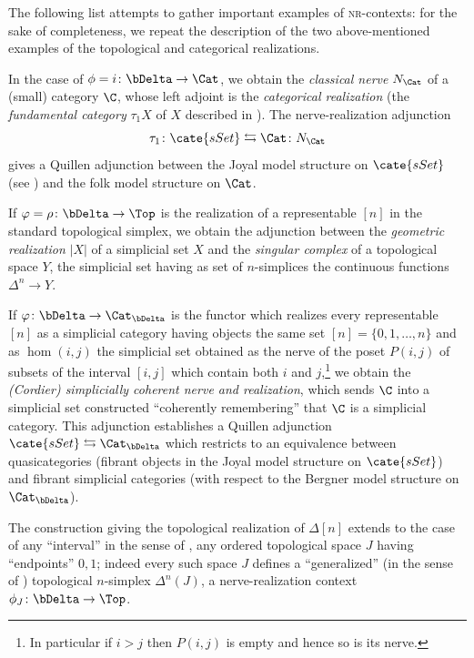 The following list attempts to gather important examples of \textsc{nr}-contexts: for the sake of completeness, we repeat the description of the two above-mentioned examples of the topological and categorical realizations.
\begin{example}\label{catnerve}
In the case of $\phi = i \colon \bDelta\to \Cat$, we obtain the \emph{classical nerve} $N_\Cat$ of a (small) category $\C$, whose left adjoint is the \emph{categorical realization} (the \emph{fundamental category} $\tau_1 X$ of $X$ described in \cite{joyal2002quasi}). The nerve\hyp{}realization adjunction
\[
\tau_1 \colon \cate{sSet}\leftrightarrows \Cat\colon N_{\Cat}
\]
gives a Quillen adjunction between the Joyal model structure on $\cate{sSet}$ (see \cite{joyal2002quasi}) and the folk model structure on $\Cat$.
\end{example}
\begin{example}\label{topnerve} 
If $\varphi = \rho \colon\bDelta\to \Top$ is the realization of a representable $[n]$ in the standard topological simplex, we obtain the adjunction between the \emph{geometric realization} $|X|$ of a simplicial set $X$ and the \emph{singular complex} of a topological space $Y$, \ie the simplicial set having as set of $n$-simplices the continuous functions $\Delta^n\to Y$.
\end{example}
\begin{example}
If $\varphi\colon \bDelta\to \Cat_{\bDelta}$ is the functor which realizes every representable $[n]$ as a simplicial category having objects the same set $[n]=\{0,1,\dots, n\}$ and as $\hom(i,j)$ 
the simplicial set obtained as the nerve of the poset $P(i,j)$ of subsets of the interval $[i,j]$ which contain both $i$ and $j$,\footnote{In particular if $i > j$ then $P(i,j)$ is empty and hence so is its nerve.} we obtain the \emph{(Cordier) simplicially coherent nerve and realization}, which sends $\C$ into a simplicial set constructed ``coherently remembering'' that $\C$ is a simplicial category. This adjunction establishes a Quillen adjunction $\cate{sSet}\leftrightarrows \Cat_{\bDelta}$ which restricts to an equivalence between quasicategories (fibrant objects in the Joyal model structure on $\cate{sSet}$) and fibrant simplicial categories (with respect to the Bergner model structure on $\Cat_{\bDelta}$).
\end{example}
\begin{example}\label{mordicchio}
The construction giving the topological realization of $\Delta[n]$ extends to the case of any ``interval'' in the sense of \cite[\S \textbf{III.1}]{Moe}, \ie any ordered topological space $J$ having ``endpoints'' $0,1$; indeed every such space $J$ defines a ``generalized'' (in the sense of \cite[\S \textbf{III.1}]{Moe}) topological $n$-simplex $\Delta^n{(J)}$, \ie a nerve\hyp{}realization context $\phi_J\colon \bDelta\to \Top$.
\end{example} 
